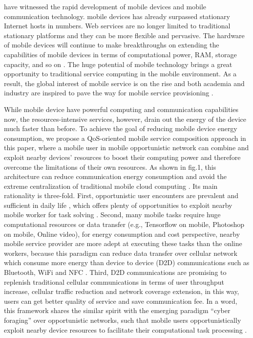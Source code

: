 \documentclass[10pt,journal,compsoc]{IEEEtran}
\begin{document}
 have witnessed the rapid development of mobile devices and mobile communication technology. 
mobile devices has already surpassed stationary Internet hosts in numbers. Web services are no longer limited to traditional stationary platforms and they can be more flexible and pervasive. The hardware of mobile devices will continue to make breakthroughs on extending the capabilities of mobile devices in terms of computational power, RAM, storage capacity, and so on \cite{Deng2017}. The huge potential of mobile technology brings a great opportunity to traditional service computing in the mobile environment. As a result, the global interest of mobile service is on the rise and both academia and industry are inspired to pave the way for mobile service provisioning \cite{dinh2013survey,hu2014multidimensional}.

While mobile device have powerful computing and communication capabilities now, the resources-intensive services, however, drain out the energy of the device much faster than before. 
To achieve the goal of reducing mobile device energy consumption, we propose a QoS-oriented mobile service composition approach in this paper, where a mobile user in mobile opportunistic network can combine and exploit nearby devices' resources to boost their computing power and therefore overcome the limitations of their own resources. As shown in fig.1, this architecture can reduce communication energy consumption and avoid the extreme centralization of traditional mobile cloud computing \cite{Giordano2011}. Its main rationality is three-fold. First, opportunistic user encounters are prevalent and sufficient in daily life \cite{liu2013exploring}, which offers plenty of opportunities to exploit nearby mobile worker for task solving \cite{chang2015progressive,heimerl2012communitysourcing,agapie2015crowdsourcing}. Second, many mobile tasks require huge computational resources or data transfer (e.g., Tensorflow on mobile, Photoshop on mobile, Online video), for energy consumption and cost perspective, nearby mobile service provider are more adept at executing these tasks than the online workers, because this paradigm can reduce data transfer over cellular network which consume more energy than device to device (D2D) communications such as Bluetooth, WiFi and NFC \cite{Balani}. Third, D2D communications are promising to replenish traditional cellular communications in terms of user throughput increase, cellular traffic reduction and network coverage extension, in this way, users can get better quality of service and save communication fee\cite{asadi2014survey}. In a word, this framework shares the similar spirit with the emerging paradigm “cyber foraging” over opportunistic networks, such that mobile users opportunistically exploit nearby device resources to facilitate their computational task processing \cite{shi2012serendipity,li2014can,zhang2015offloading}.
\end{document}
